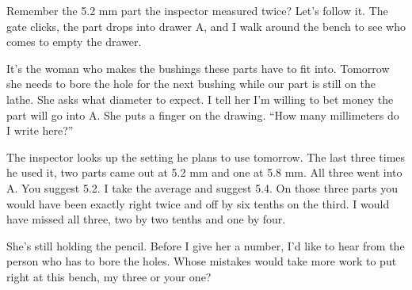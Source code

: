 Remember the 5.2 mm part the inspector measured twice? Let's follow it. The gate clicks, the part drops into drawer A, and I walk around the bench to see who comes to empty the drawer.

It's the woman who makes the bushings these parts have to fit into. Tomorrow she needs to bore the hole for the next bushing while our part is still on the lathe. She asks what diameter to expect. I tell her I'm willing to bet money the part will go into A. She puts a finger on the drawing. “How many millimeters do I write here?”

The inspector looks up the setting he plans to use tomorrow. The last three times he used it, two parts came out at 5.2 mm and one at 5.8 mm. All three went into A. You suggest 5.2. I take the average and suggest 5.4. On those three parts you would have been exactly right twice and off by six tenths on the third. I would have missed all three, two by two tenths and one by four.

She's still holding the pencil. Before I give her a number, I'd like to hear from the person who has to bore the holes. Whose mistakes would take more work to put right at this bench, my three or your one?

